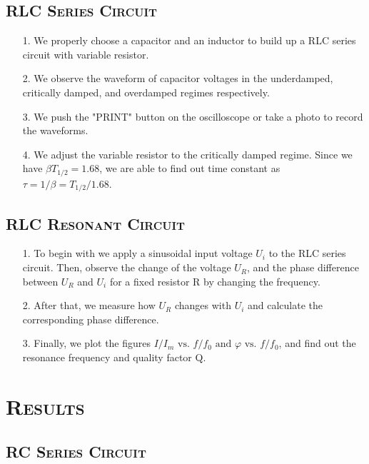 \documentclass[a4paper,12pt]{article}
\begin{document}
\subsection{\textsc{RLC Series Circuit}}
\begin{itemize}
\item[1.] We properly choose a capacitor and an inductor to build up a RLC series circuit with variable resistor.
\item[2.] We observe the waveform of capacitor voltages in the underdamped, critically damped, and overdamped regimes respectively.
\item[3.] We push the "PRINT" button on the oscilloscope or take a photo to record the waveforms.
\item[4.] We adjust the variable resistor to the critically damped regime. Since we have $\beta T_{1/2} = 1.68$, we are able to find out time constant as $\tau=1 / \beta=T_{1 / 2} / 1.68$.
\end{itemize}
\subsection{\textsc{RLC Resonant Circuit}}
\begin{itemize}
\item[1.] To begin with we apply a sinusoidal input voltage $U_i$ to the RLC series circuit. Then, observe the change of the voltage $U_R$, and the phase difference between $U_R$ and $U_i$ for a fixed resistor R by changing the frequency.
\item[2.] After that, we measure how $U_R$ changes with $U_i$ and calculate the corresponding phase difference.
\item[3.] Finally, we plot the figures $I / I_{m} \text { vs. } f / f_{0} \text { and } \varphi \text { vs. } f / f_{0}$, and find out the resonance frequency and quality factor Q.
\end{itemize}

\section{\textsc{Results}}
\subsection{\textsc{RC Series Circuit}}
\end{document}
